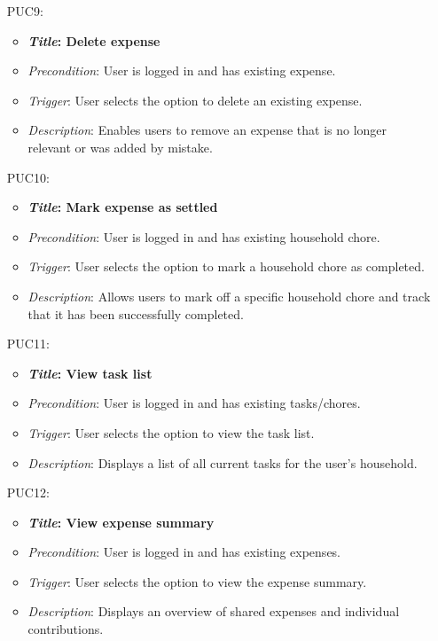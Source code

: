 \documentclass[12pt]{article}
\begin{document}
\begin{itemize}
    \item[PUC9:]
        \begin{itemize}
            \item \textbf{\textit{Title}: Delete expense}
            \item \textit{Precondition}: User is logged in and has existing expense.
            \item \textit{Trigger}: User selects the option to delete an existing expense.
            \item \textit{Description}: Enables users to remove an expense that is no longer relevant or was added by mistake.
    \end{itemize}

    \item[PUC10:]
        \begin{itemize}
            \item \textbf{\textit{Title}: Mark expense as settled}
            \item \textit{Precondition}: User is logged in and has existing household chore.
            \item \textit{Trigger}: User selects the option to mark a household chore as completed.
            \item \textit{Description}: Allows users to mark off a specific household chore and track that it has been successfully completed.
    \end{itemize}

    \item[PUC11:]
        \begin{itemize}
            \item \textbf{\textit{Title}: View task list}
            \item \textit{Precondition}: User is logged in and has existing tasks/chores.
            \item \textit{Trigger}: User selects the option to view the task list.
            \item \textit{Description}: Displays a list of all current tasks for the user's household.
    \end{itemize}

    \item[PUC12:]
        \begin{itemize}
            \item \textbf{\textit{Title}: View expense summary}
            \item \textit{Precondition}: User is logged in and has existing expenses.
            \item \textit{Trigger}: User selects the option to view the expense summary.
            \item \textit{Description}: Displays an overview of shared expenses and individual contributions.
    \end{itemize}


\end{itemize}
\end{document}
